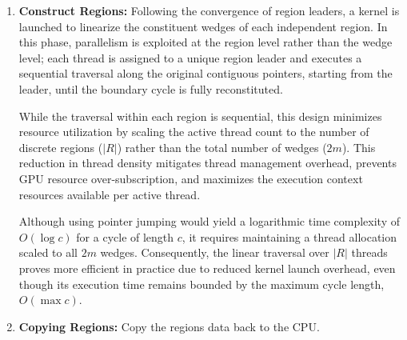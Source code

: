 \begin{enumerate}
    \item \textbf{Construct Regions:} Following the convergence of region leaders, a kernel is launched to linearize the constituent wedges of each independent region. In this phase, parallelism is exploited at the region level rather than the wedge level; each thread is assigned to a unique region leader and executes a sequential traversal along the original contiguous pointers, starting from the leader, until the boundary cycle is fully reconstituted. 

    While the traversal within each region is sequential, this design minimizes resource utilization by scaling the active thread count to the number of discrete regions ($|R|$) rather than the total number of wedges ($2m$). This reduction in thread density mitigates thread management overhead, prevents GPU resource over-subscription, and maximizes the execution context resources available per active thread.
    
    Although using pointer jumping would yield a logarithmic time complexity of $O(\log c)$ for a cycle of length $c$, it requires maintaining a thread allocation scaled to all $2m$ wedges. Consequently, the linear traversal over $|R|$ threads proves more efficient in practice due to reduced kernel launch overhead, even though its execution time remains bounded by the maximum cycle length, $O(\max c)$.
    
    \item \textbf{Copying Regions:} Copy the regions data back to the CPU.
\end{enumerate}

